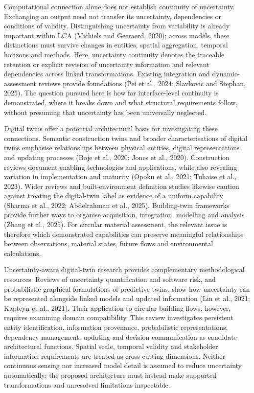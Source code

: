 Computational connection alone does not establish continuity of uncertainty. Exchanging an output need not transfer its uncertainty, dependencies or conditions of validity. Distinguishing uncertainty from variability is already important within LCA (Michiels and Geeraerd, 2020); across models, these distinctions must survive changes in entities, spatial aggregation, temporal horizons and methods. Here, uncertainty continuity denotes the traceable retention or explicit revision of uncertainty information and relevant dependencies across linked transformations. Existing integration and dynamic-assessment reviews provide foundations (Pei et al., 2024; Slavkovic and Stephan, 2025). The question pursued here is how far interface-level continuity is demonstrated, where it breaks down and what structural requirements follow, without presuming that uncertainty has been universally neglected.

Digital twins offer a potential architectural basis for investigating these connections. Semantic construction twins and broader characterisations of digital twins emphasise relationships between physical entities, digital representations and updating processes (Boje et al., 2020; Jones et al., 2020). Construction reviews document enabling technologies and applications, while also revealing variation in implementation and maturity (Opoku et al., 2021; Tuhaise et al., 2023). Wider reviews and built-environment definition studies likewise caution against treating the digital-twin label as evidence of a uniform capability (Sharma et al., 2022; Abdelrahman et al., 2025). Building-twin frameworks provide further ways to organise acquisition, integration, modelling and analysis (Zhang et al., 2025). For circular material assessment, the relevant issue is therefore which demonstrated capabilities can preserve meaningful relationships between observations, material states, future flows and environmental calculations.

Uncertainty-aware digital-twin research provides complementary methodological resources. Reviews of uncertainty quantification and software risk, and probabilistic graphical formulations of predictive twins, show how uncertainty can be represented alongside linked models and updated information (Lin et al., 2021; Kapteyn et al., 2021). Their application to circular building flows, however, requires examining domain compatibility. This review investigates persistent entity identification, information provenance, probabilistic representations, dependency management, updating and decision communication as candidate architectural functions. Spatial scale, temporal validity and stakeholder information requirements are treated as cross-cutting dimensions. Neither continuous sensing nor increased model detail is assumed to reduce uncertainty automatically; the proposed architecture must instead make supported transformations and unresolved limitations inspectable.

